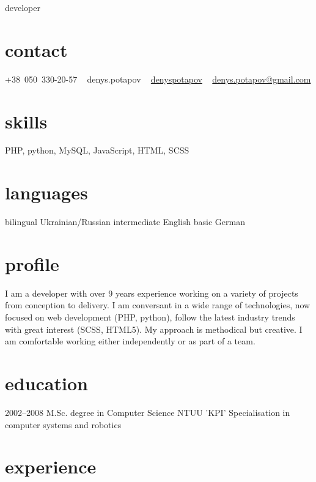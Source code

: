 \documentclass[hidelinks,a4paper]{cv}
\providecommand\faSkype{{\FA\symbol{"F17E}}}
\begin{document}
       {developer}


\begin{aside}
  \section{contact}
     +38~050~330-20-57
     \faSkype~ denys.potapov
     \faLinkedin~ \href{https://www.linkedin.com/in/denyspotapov}{denyspotapov}
     ~
     \href{mailto:denys.potapov@gmail.com}{denys.potapov@gmail.com}
  \section{skills}
    PHP, python, MySQL,
    JavaScript, HTML, SCSS
  \section{languages}
    bilingual Ukrainian/Russian
    intermediate English
    basic German
\end{aside}

\section{profile}
I am a developer with over 9 years experience working on a variety of projects from conception to delivery. I am conversant in a wide range of technologies, now focused on web development (PHP, python), follow the latest industry trends with great interest (SCSS, HTML5). My approach is methodical but creative. I am comfortable working either independently or as part of a team.
\section{education}

\begin{entrylist}
  \entry
    {2002–2008}
    {M.Sc. degree in Computer Science}
    {NTUU 'KPI'}
    {Specialisation in computer systems and robotics}
\end{entrylist}

\section{experience}
\end{document}
